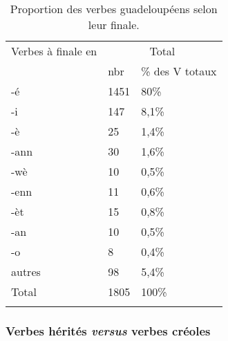 \documentclass[output=paper]{langsci/langscibook}
\begin{document}
\begin{table}
\begin{tabular}{lll}
\lsptoprule
Verbes à finale en & \multicolumn{2}{c}{Total}\\
& nbr & \% des V totaux \\
\midrule
-é & 1451 & 80\%\\
-i & 147 & 8,1\%\\
-è & 25 & 1,4\%\\
-ann & 30 & 1,6\%\\
-wè & 10 & 0,5\%\\
-enn & 11 & 0,6\%\\
-èt & 15 & 0,8\%\\
-an & 10 & 0,5\%\\
-o & 8 & 0,4\%\\
autres & 98 &
5,4\%\\
Total & 1805 & 100\%\\

\lspbottomrule
\end{tabular}
\caption{Proportion des verbes guadeloupéens selon leur finale.}
\label{tab:VilloingDeglas:2}
\end{table}



\subsubsection{\texorpdfstring{Verbes hérités \emph{versus} verbes
créoles}{Verbes hérités versus verbes créoles}}\label{verbes-hérités-versus-verbes-créoles}
\end{document}
